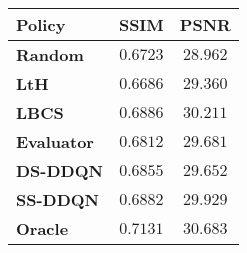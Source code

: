 \begin{tabular}{lcc}
 \toprule
\multirow{1}{*}{\textbf{Policy}}& SSIM& PSNR\\
\midrule
\textbf{Random} & $0.6723$ &  $28.962$ \\
\textbf{LtH} & $0.6686$ & $29.360$\\
\textbf{LBCS} & $\mathbf{0.6886}$ & $\mathbf{ 30.211}$\\
\textbf{Evaluator} & $0.6812$& $29.681$ \\
\textbf{DS-DDQN} & $0.6855$& $29.652$ \\
\textbf{SS-DDQN} & $0.6882$& $29.929$ \\
\midrule
\textbf{Oracle} & $0.7131$ & $30.683$\\

\bottomrule
\end{tabular}